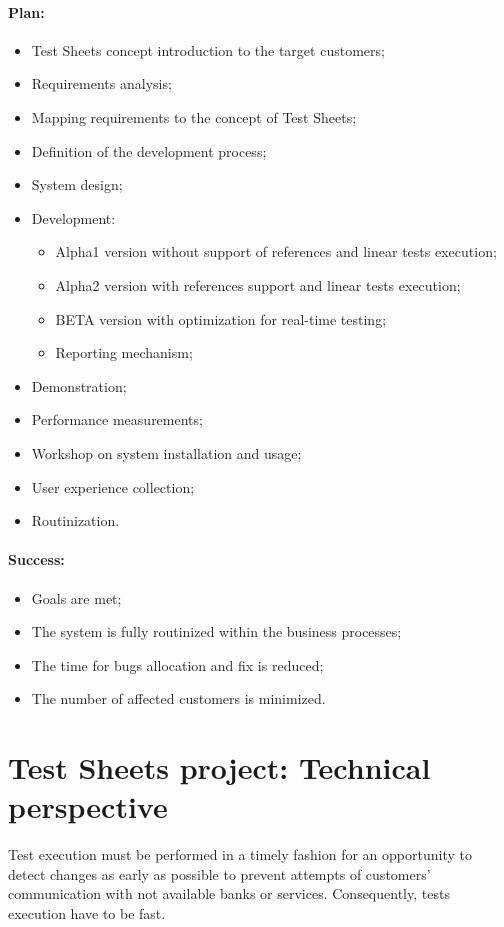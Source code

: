\paragraph{Plan:}
\begin{itemize}
	\item Test Sheets concept introduction to the target customers;
	\item Requirements analysis;
	\item Mapping requirements to the concept of Test Sheets;
	\item Definition of the development process;
	\item System design;
	\item Development:
	\begin{itemize}
		\item Alpha1 version without support of references and linear tests execution;
		\item Alpha2 version with references support and linear tests execution;
		\item BETA version with optimization for real-time testing;
		\item Reporting mechanism;
	\end{itemize}
	\item Demonstration;
	\item Performance measurements;
	\item Workshop on system installation and usage;
	\item User experience collection;
	\item Routinization.
\end{itemize}

\paragraph{Success:}
\begin{itemize}
	\item Goals are met;
	\item The system is fully routinized within the business processes;
	\item The time for bugs allocation and fix is reduced;
	\item The number of affected customers is minimized.
\end{itemize}


\section{Test Sheets project: Technical perspective}
Test execution must be performed in a timely fashion for an opportunity to detect changes as early as possible to prevent attempts of customers' communication with not available banks or services. Consequently, tests execution have to be fast.


